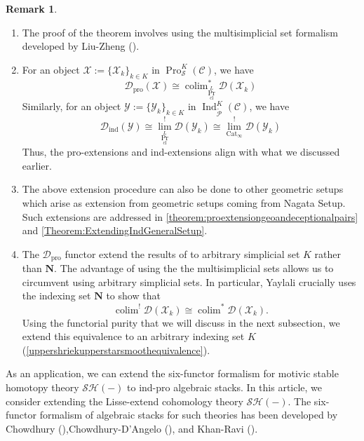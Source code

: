 \documentclass[14pt]{article}
\theoremstyle{definition}
\newtheorem{remark}[theorem]{Remark}
\newcommand{\D}{\mathcal{D}}
\renewcommand{\P}{\mathcal{P}}
\newcommand{\op}[1]{\operatorname{#1}}
\renewcommand{\S}{\mathcal{S}}
\newcommand{\Ca}{\mathcal{C}}
\newcommand{\X}{\mathcal{X}}
\numberwithin{subsection}{section}
\newcommand{\SH}{\mathcal{SH}}
\newcommand{\Y}{\mathcal{Y}}
\begin{document}
\begin{remark}
\begin{enumerate}
 \item    The proof of the theorem involves using the multisimplicial set formalism developed by Liu-Zheng (\cite{liu2017enhanced}). 
\item For an object $\X:=\{\X_k\}_{k \in K}$ in $\op{Pro}^K_{\S}(\Ca)$, we have 
\begin{equation}
    \D_{\op{pro}}(\X) \cong \op{colim}_{\op{Pr}^L_{\op{cl}}}^* \D(\X_k)
\end{equation}
Similarly, for an object $\Y:= \{ \Y_k\}_{k \in K}$ in $\op{Ind}^K_{\tilde{\P}}(\Ca)$, we have
\begin{equation}
    \D_{\op{ind}}(\Y) \cong \op{lim}_{\op{Pr}^L_{\op{cl}}}^! \D(\Y_k) \cong \op{lim}_{\op{Cat}_{\infty}}^! \D(\Y_k)
\end{equation}
Thus, the pro-extensions  and ind-extensions align with what we discussed earlier.
\item The above extension procedure can also be done to other geometric setups which arise as extension from geometric setups coming from Nagata Setup. Such extensions are addressed in \cref{theorem:proextensiongeoandeceptionalpairs} and \cref{Theorem:ExtendingIndGeneralSetup}.

\item  The $\D_{\op{pro}}$ functor extend the results of \cite{yaylali2025rationalmotivesproalgebraicstacks} to arbitrary simplicial set $K$ rather than $\mathbf{N}$.  The advantage of using the the multisimplicial sets allows us to circumvent using arbitrary simplicial sets. In particular, Yaylali crucially uses the indexing set $\mathbf{N}$ to show that
\begin{equation}
    \op{colim}^!\D(\X_k) \cong \op{colim}^*\D(\X_k) .
\end{equation}
Using the functorial purity that we will discuss in the next subsection, we extend this equivalence to an arbitrary indexing set $K$ (\cref{uppershriekupperstarsmoothequivalence}).


    \end{enumerate}
\end{remark}
As an application, we can extend the six-functor formalism for motivic stable homotopy theory $\SH(-)$ to ind-pro algebraic stacks. In this article, we consider extending the Lisse-extend cohomology theory $\SH(-)$. The six-functor formalism of algebraic stacks for such theories has been developed by Chowdhury (\cite{Chowdhury}),Chowdhury-D'Angelo (\cite{chowdhury2025nonrepresentablesixfunctorformalisms}), and Khan-Ravi (\cite{Khan-Ravi_Generalised_Coh_Stacks}).\\
\end{document}
